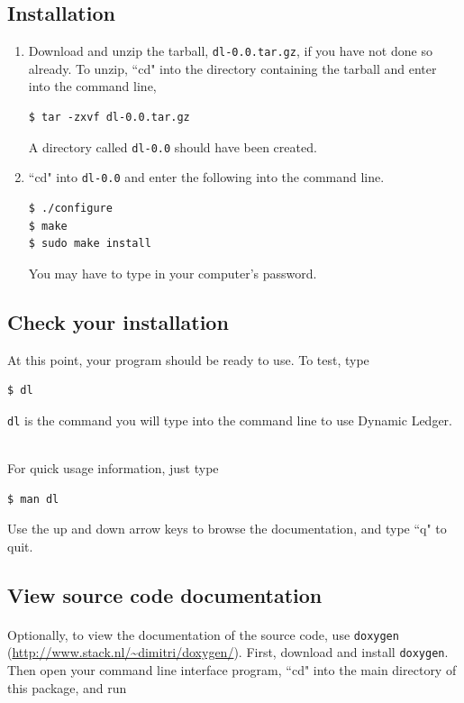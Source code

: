 \documentclass{article}
\providecommand{\q}{$\quad$ \newline}
\begin{document}
\begin{flushleft}
\subsection{Installation}
\begin{enumerate}
\item Download and unzip the tarball, {\tt dl-0.0.tar.gz}, if you have not done so already. To unzip, ``cd" into the directory containing the tarball and enter into the command line,

\begin{lstlisting}
$ tar -zxvf dl-0.0.tar.gz
\end{lstlisting}

A directory called {\tt dl-0.0} should have been created.

\item ``cd" into {\tt dl-0.0} and enter the following into the command line.

\begin{lstlisting}
$ ./configure
$ make
$ sudo make install
\end{lstlisting}

You may have to type in your computer's password.
\end{enumerate}

\subsection{Check your installation}

At this point, your program should be ready to use. To test, type

\begin{lstlisting}
$ dl
\end{lstlisting}

{\tt dl} is the command you will type into the command line to use Dynamic Ledger. \q

For quick usage information, just type

\begin{lstlisting}
$ man dl
\end{lstlisting}

Use the up and down arrow keys to browse the documentation, and type ``q" to quit. 

\subsection{View source code documentation}

\paragraph{} Optionally, to view the documentation of the source code, use {\tt doxygen} (\url{http://www.stack.nl/~dimitri/doxygen/}). First, download and install {\tt doxygen}. Then open your command line interface program, ``cd" into the main directory of this package, and run


\end{flushleft}
\end{document}
